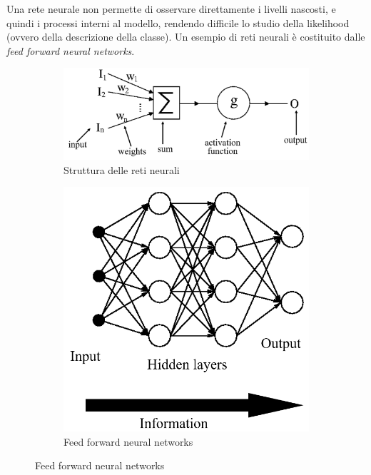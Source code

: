 \documentclass[a4paper,oneside,titlepage]{book}
\begin{document}
Una rete neurale non permette di osservare direttamente i livelli nascosti, e quindi i processi interni al modello, rendendo difficile lo studio della likelihood (ovvero della descrizione della classe). Un esempio di reti neurali è costituito dalle \textit{feed forward neural networks}.
\begin{figure}[htp]
	\begin{subfigure}{0.49\textwidth}
	    \centering
		\includegraphics[width=\textwidth, height=\textheight, keepaspectratio]{nn.png}
		\caption{Struttura delle reti neurali}
	\end{subfigure}
	\hfill
	\begin{subfigure}{0.49\textwidth}
	    \centering
		\includegraphics[width=\textwidth, height=\textheight, keepaspectratio]{ffnn.png}
		\caption{Feed forward neural networks}
	\end{subfigure}
\end{figure}
\end{document}
